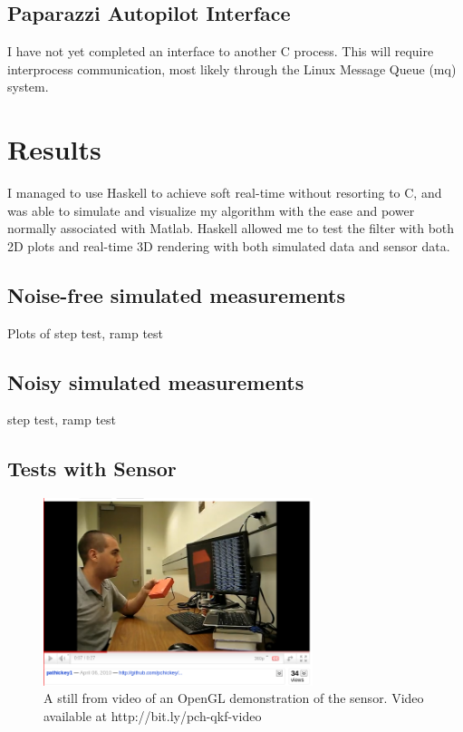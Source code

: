 \documentclass[12pt]{report}
\begin{document}
\subsection{Paparazzi Autopilot Interface}
I have not yet completed an interface to another C process. This will require interprocess communication, most likely through the Linux Message Queue (mq) system.

\section{Results}

I managed to use Haskell to achieve soft real-time without resorting to C, and was able to simulate and visualize my algorithm with the ease and power normally associated with Matlab. Haskell allowed me to test the filter with both 2D plots and real-time 3D rendering with both simulated data and sensor data.

\subsection{Noise-free simulated measurements}
Plots of step test, ramp test
\subsection{Noisy simulated measurements}
step test, ramp test
\subsection{Tests with Sensor}
\begin{figure}
  \centering
    \includegraphics[width=0.7\textwidth]{./youtube-screenshot.png}
  \caption{A still from video of an OpenGL demonstration of the sensor. Video available at http://bit.ly/pch-qkf-video}
\end{figure}




\end{document}
